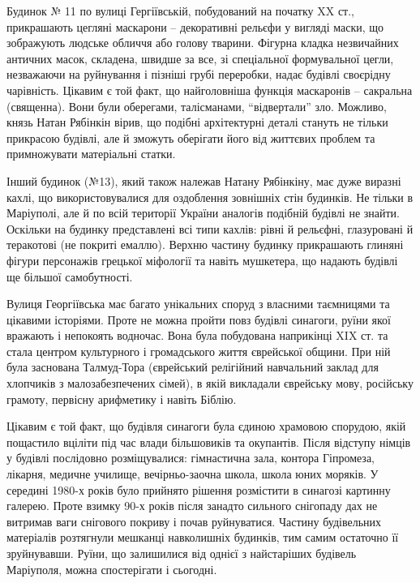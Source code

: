 Будинок № 11 по вулиці Гергіївській, побудований на початку XX ст., прикрашають
цегляні маскарони – декоративні рельєфи у вигляді маски, що зображують людське
обличчя або голову тварини. Фігурна кладка незвичайних античних масок,
складена, швидше за все, зі спеціальної формувальної цегли, незважаючи на
руйнування і пізніші грубі переробки, надає будівлі своєрідну чарівність.
Цікавим є той факт, що найголовніша функція маскаронів – сакральна (священна).
Вони були оберегами, талісманами, \enquote{відвертали} зло. Можливо, князь Натан
Рябінкін вірив, що подібні архітектурні деталі стануть не тільки прикрасою
будівлі, але й зможуть оберігати його від життєвих проблем та примножувати
матеріальні статки.


Інший будинок (№13), який також належав Натану Рябінкіну, має дуже виразні
кахлі, що використовувалися для оздоблення зовнішніх стін будинків. Не тільки в
Маріуполі, але й по всій території України аналогів подібній будівлі не знайти.
Оскільки на будинку представлені всі типи кахлів: рівні й рельєфні, глазуровані
й теракотові (не покриті емаллю). Верхню частину будинку прикрашають глиняні
фігури персонажів грецької міфології та навіть мушкетера, що надають будівлі ще
більшої самобутності.


Вулиця Георгіївська має багато унікальних споруд з власними таємницями та
цікавими історіями. Проте не можна пройти повз будівлі синагоги, руїни якої
вражають і непокоять водночас. Вона була побудована наприкінці XIX ст. та стала
центром культурного і громадського життя єврейської общини. При ній була
заснована Талмуд-Тора (єврейський релігійний навчальний заклад для хлопчиків з
малозабезпечених сімей), в якій викладали єврейську мову, російську грамоту,
первісну арифметику і навіть Біблію.


Цікавим є той факт, що будівля синагоги була єдиною храмовою спорудою, якій
пощастило вціліти під час влади більшовиків та окупантів. Після відступу німців
у будівлі послідовно розміщувалися: гімнастична зала, контора Гіпромеза,
лікарня, медичне училище, вечірньо-заочна школа, школа юних моряків. У середині
1980-х років було прийнято рішення розмістити в синагозі картинну галерею.
Проте взимку 90-х років після занадто сильного снігопаду дах не витримав ваги
снігового покриву і почав руйнуватися. Частину будівельних матеріалів
розтягнули мешканці навколишніх будинків, тим самим остаточно її зруйнувавши.
Руїни, що залишилися від однієї з найстаріших будівель Маріуполя, можна
спостерігати і сьогодні.

